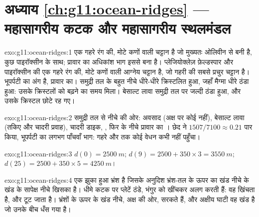 \section*{अध्याय \ref{ch:g11:ocean-ridges} --- महासागरीय कटक और महासागरीय स्थलमंडल}

\begin{solution}{exo:g11:ocean-ridges:1}
 एक गहरे रंग की, मोटे कणों वाली चट्टान है जो मुख्यतः ओलिवीन से बनी है, कुछ
पाइरॉक्सीन के साथ; प्रावार का अधिकांश भाग इससे बना है।  प्लेजियोक्लेज़ फ़ेल्डस्पार और पाइरॉक्सीन की
एक गहरे रंग की, मोटे कणों वाली आग्नेय चट्टान है, जो गहरी  की सबसे प्रचुर
चट्टान है।  भूपर्पटी का अंग है,  प्रावार का।
 समुद्री तल के बहुत नीचे धीरे-धीरे क्रिस्टलित हुआ, जहाँ मैग्मा
धीरे ठंडा हुआ: उसके क्रिस्टलों को बढ़ने का समय मिला। बेसाल्ट लावा समुद्री
तल पर जल्दी ठंडा हुआ, और उसके क्रिस्टल छोटे रह गए।
\end{solution}

\begin{solution}{exo:g11:ocean-ridges:2}
समुद्री तल से नीचे की ओर: अवसाद (अक्ष पर कोई नहीं), बेसाल्ट लावा (तकिए
और चादरी प्रवाह), चादरी डाइक, , फिर  के नीचे
प्रावार का । छेद ने $1507/7100 \approx 0.21$ पार किया, भूपर्पटी का
लगभग पाँचवाँ भाग: गहरे  और  तक कोई वेधन कभी नहीं पहुँचा।
\end{solution}

\begin{solution}{exo:g11:ocean-ridges:3}
$d(0) = \qty{2500}{m}$; $d(9) = 2500 + 350 \times 3 = \qty{3550}{m}$;
$d(25) = 2500 + 350 \times 5 = \qty{4250}{m}$।
\end{solution}

\begin{solution}{exo:g11:ocean-ridges:4}
 एक झुका हुआ भ्रंश है जिसके अनुदिश भ्रंश-तल के ऊपर का
खंड नीचे के खंड के सापेक्ष नीचे खिसका है। धीमे कटक पर प्लेटें
ठंडे, भंगुर  को खींचकर अलग करती हैं: वह खिंचता है, और टूट जाता है।
भ्रंशों के ऊपर के खंड नीचे, अक्ष की ओर, सरकते हैं, और अक्षीय घाटी
वह खंड है जो उनके बीच धँस गया है।
\end{solution}

